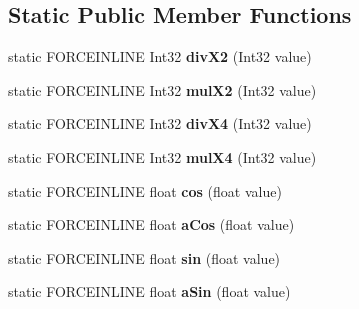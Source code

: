 \subsection*{Static Public Member Functions}
\begin{DoxyCompactItemize}
\item 
\mbox{\label{structdrider_s_d_k_1_1_math_a3192a644fe4aeb8e92586a1ce46f46be}} 
static F\+O\+R\+C\+E\+I\+N\+L\+I\+NE Int32 {\bfseries div\+X2} (Int32 value)
\item 
\mbox{\label{structdrider_s_d_k_1_1_math_ab2a5340cbec26d72f8bb7c2203567eec}} 
static F\+O\+R\+C\+E\+I\+N\+L\+I\+NE Int32 {\bfseries mul\+X2} (Int32 value)
\item 
\mbox{\label{structdrider_s_d_k_1_1_math_a3efb6f8d9f0b62bc474aeeec132742cd}} 
static F\+O\+R\+C\+E\+I\+N\+L\+I\+NE Int32 {\bfseries div\+X4} (Int32 value)
\item 
\mbox{\label{structdrider_s_d_k_1_1_math_a68ec13ff5f4725012aaeab0e1e933fa5}} 
static F\+O\+R\+C\+E\+I\+N\+L\+I\+NE Int32 {\bfseries mul\+X4} (Int32 value)
\item 
\mbox{\label{structdrider_s_d_k_1_1_math_a12283b38e8d9a0a5835c913da6ee594a}} 
static F\+O\+R\+C\+E\+I\+N\+L\+I\+NE float {\bfseries cos} (float value)
\item 
\mbox{\label{structdrider_s_d_k_1_1_math_a736701db523a395c3c6d36387f00d522}} 
static F\+O\+R\+C\+E\+I\+N\+L\+I\+NE float {\bfseries a\+Cos} (float value)
\item 
\mbox{\label{structdrider_s_d_k_1_1_math_a956245828d481346556ad747b5cdd855}} 
static F\+O\+R\+C\+E\+I\+N\+L\+I\+NE float {\bfseries sin} (float value)
\item 
\mbox{\label{structdrider_s_d_k_1_1_math_a8340737920a5e8095ba7df9d5452b6ee}} 
static F\+O\+R\+C\+E\+I\+N\+L\+I\+NE float {\bfseries a\+Sin} (float value)
\item 
\mbox{\label{structdrider_s_d_k_1_1_math_a7d746ca10ffc6794b43008fd7f9c4dfc}} 

\end{DoxyCompactItemize}
